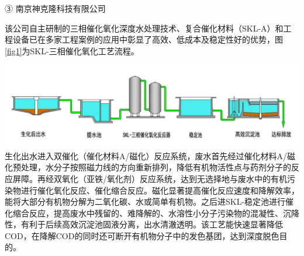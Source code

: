 ③ 南京神克隆科技有限公司

该公司自主研制的三相催化氧化深度水处理技术、复合催化材料（SKL-A）和工程设备已在多家工程案例的应用中彰显了高效、低成本及稳定性好的优势，图\ref{fig1}为SKL-三相催化氧化工艺流程。

{
    \centering 
    \includegraphics[width=150mm]{Img/fig1.jpg}
    \label{fig1}
}
生化出水进入双催化（催化材料A/磁化）反应系统，废水首先经过催化材料A/磁化预处理，水分子按照磁力线的方向重新排列，降低有机物活性点与药剂分子的反应屏障。再经双氧化（亚铁/氧化剂）反应系统，达到无选择地与废水中的有机污染物进行催化氧化反应、催化缩合反应。磁化显著提高催化反应速度和降解效率，能将大部分有机物分解为二氧化碳、水或简单有机物。之后进SKL-稳定池进行催化缩合反应，提高废水中残留的、难降解的、水溶性小分子污染物的混凝性、沉降性，有利于后续高效沉淀池固液分离，出水清澈透明。该工艺能快速显著降低COD，在降解COD的同时还可断开有机物分子中的发色基团，达到深度脱色目的。\par







